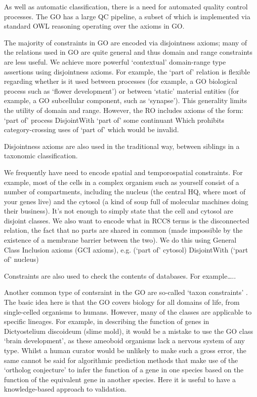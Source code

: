 \documentclass{llncs}
\begin{document}
As well as automatic classification, there is a need for automated quality control processes. The GO has a large QC pipeline, a subset of which is implemented via standard OWL reasoning operating over the axioms in GO.

The majority of constraints in GO are encoded via disjointness axioms; many of the relations used in GO are quite general and thus domain and range constraints are less useful. We achieve more powerful ‘contextual’ domain-range type assertions using disjointness axioms. For example, the `part of' relation is flexible regarding whether is it used between processes (for example, a GO biological process such as ‘flower development’) or between ‘static’ material entities (for example, a GO subcellular component, such as ‘synapse’). This generality limits the utility of domain and range. However, the RO includes axioms of the form:
    `part of' process DisjointWith `part of' some continuant
Which prohibits category-crossing uses of `part of' which would be invalid.

Disjointness axioms are also used in the traditional way, between siblings in a taxonomic classification.

We frequently have need to encode spatial and temporospatial constraints. For example, most of the cells in a complex organism such as yourself consist of a number of compartments, including the nucleus (the central HQ, where most of your genes live) and the cytosol (a kind of soup full of molecular machines doing their business). It’s not enough to simply state that the cell and cytosol are disjoint classes. We also want to encode what in RCC8 terms is the disconnected relation, the fact that no parts are shared in common (made impossible by the existence of a membrane barrier between the two). We do this using General Class Inclusion axioms (GCI axioms), e.g.
     (`part of' cytosol) DisjointWith (`part of' nucleus)

Constraints are also used to check the contents of databases. For example…..

Another common type of contsraint in the GO are so-called `taxon constraints' \cite{Deegan2010}. The basic idea here is that the GO covers biology for all domains of life, from single-celled organisms to humans. However, many of the classes are applicable to specific lineages. For example, in describing the function of genes in Dictyostelium discoideum (slime mold), it would be a mistake to use the GO class ‘brain development’, as these ameoboid organisms lack a nervous system of any type. Whilst a human curator would be unlikely to make such a gross error, the same cannot be said for algorithmic prediction methods that make use of the `ortholog conjecture' to infer the function of a gene in one species based on the function of the equivalent gene in another species. Here it is useful to have a knowledge-based approach to validation.
\end{document}
